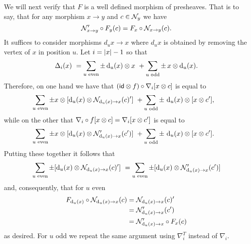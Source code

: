 We will next verify that $F$ is a well defined morphism of presheaves.
That is to say, that for any morphism $x \to y$ and $c \in \mathcal{N}_y$ we have
\[
\mathcal{N}'_{x \to y} \circ F_y(c) = F_x \circ \mathcal{N}_{x \to y}(c).
\]
It suffices to consider morphisms $d_u x \to x$ where $d_u x$ is obtained by removing the vertex of $x$ in position $u$.
Let $i = \lvert x\rvert-1$ so that
\[
\Delta_i(x) \ =
\sum_{u \text{ even}} \pm \operatorname{d}_u(x) \otimes x \ +
\sum_{u \text{ odd}} \pm \, x \otimes \operatorname{d}_u(x).
\]
Therefore, on one hand we have that $(\mathsf{id} \otimes f) \circ \nabla_i [x \otimes c]$ is equal to
\begin{align*}
	&\sum_{u \text{ even}} \pm x \otimes [\operatorname{d}_u(x) \otimes \mathcal{N}_{\operatorname{d}_u(x) \to x}(c)'] \ +
	\sum_{u \text{ odd}} \pm \, \operatorname{d}_u(x) \otimes [x \otimes c'],
\end{align*}
while on the other that $\nabla_i \circ f [x \otimes c] = \nabla_i [x \otimes c']$ is equal to
\begin{align*}
	&\sum_{u \text{ even}} \pm x \otimes [\operatorname{d}_u(x) \otimes \mathcal{N}'_{\operatorname{d}_u(x) \to x}(c')] \ +
	\sum_{u \text{ odd}} \pm \, \operatorname{d}_u(x) \otimes [x \otimes c'].
\end{align*}
Putting these together it follows that
\[
	\sum_{u \text{ even}} \pm [\operatorname{d}_u(x) \otimes \mathcal{N}_{\operatorname{d}_u(x) \to x}(c)'] \ =
	\sum_{u \text{ even}} \pm [\operatorname{d}_u(x) \otimes \mathcal{N}'_{\operatorname{d}_u(x) \to x}(c')]
\]
and, consequently, that for $u$ even
\begin{align*}
	F_{\operatorname{d}_u(x)} \circ \mathcal{N}_{\operatorname{d}_u(x) \to x}(c) &=
	\mathcal{N}_{\operatorname{d}_u(x) \to x}(c)' \\ &=
	\mathcal{N}'_{\operatorname{d}_u(x) \to x}(c') \\ &=
	\mathcal{N}'_{\operatorname{d}_u(x) \to x} \circ F_{x}(c)
\end{align*}
as desired.
For $u$ odd we repeat the same argument using $\nabla_i^T$ instead of $\nabla_i$.
